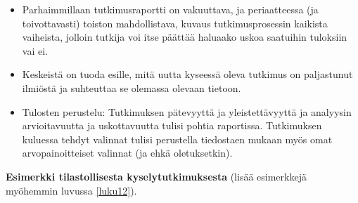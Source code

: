 \documentclass[
]{book}
\providecommand{\tightlist}{%
  \setlength{\itemsep}{0pt}\setlength{\parskip}{0pt}}
\begin{document}
\begin{itemize}
  \begin{itemize}
  \tightlist
  \item
    Parhaimmillaan tutkimusraportti on vakuuttava, ja periaatteessa (ja toivottavasti) toiston mahdollistava, kuvaus tutkimusprosessin kaikista vaiheista, jolloin tutkija voi itse päättää haluaako uskoa saatuihin tuloksiin vai ei.
  \item
    Keskeistä on tuoda esille, mitä uutta kyseessä oleva tutkimus on paljastunut ilmiöstä ja suhteuttaa se olemassa olevaan tietoon.
  \item
    Tulosten perustelu: Tutkimuksen pätevyyttä ja yleistettävyyttä ja analyysin arvioitavuutta ja uskottavuutta tulisi pohtia raportissa. Tutkimuksen kuluessa tehdyt valinnat tulisi perustella tiedostaen mukaan myös omat arvopainoitteiset valinnat (ja ehkä oletuksetkin).
  \end{itemize}
\end{itemize}

\hfill\break

\textbf{Esimerkki tilastollisesta kyselytutkimuksesta} (lisää esimerkkejä myöhemmin luvussa \ref{luku12}).
\end{document}
